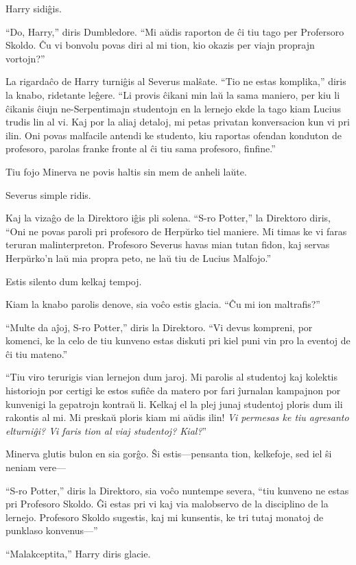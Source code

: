 Harry sidiĝis.

``Do, Harry,'' diris Dumbledore. ``Mi aŭdis raporton de ĉi tiu tago
per Profersoro Skoldo. Ĉu vi bonvolu povas diri al mi tion, kio okazis per
viajn proprajn vortojn?''

La rigardaĉo de Harry turniĝis al Severus malŝate. ``Tio ne estas
komplika,'' diris la knabo, ridetante leĝere. ``Li provis ĉikani min
laŭ la sama maniero, per kiu li ĉikanis ĉiujn ne-Serpentimajn
studentojn en la lernejo ekde la tago kiam Lucius trudis lin al
vi. Kaj por la aliaj detaloj, mi petas privatan konversacion kun vi
pri ilin. Oni povas malfacile antendi ke studento, kiu raportas
ofendan konduton de profesoro, parolas franke fronte al ĉi tiu sama
profesoro, finfine.''

Tiu fojo Minerva ne povis haltis sin mem de anheli laŭte.

Severus simple ridis.

Kaj la vizaĝo de la Direktoro iĝis pli solena. ``S-ro Potter,'' la
Direktoro diris, ``Oni ne povas paroli pri profesoro de Herpŭrko tiel
maniere. Mi timas ke vi faras teruran malinterpreton. Profesoro
Severus havas mian tutan fidon, kaj servas Herpŭrko'n laŭ mia propra
peto, ne laŭ tiu de Lucius Malfojo.''

Estis silento dum kelkaj tempoj.

Kiam la knabo parolis denove, sia voĉo estis glacia. ``Ĉu mi ion
maltrafis?''

``Multe da aĵoj, S-ro Potter,'' diris la Direktoro. ``Vi devus
kompreni, por komenci, ke la celo de tiu kunveno estas diskuti pri
kiel puni vin pro la eventoj de ĉi tiu mateno.''

``Tiu viro terurigis vian lernejon dum jaroj. Mi parolis al studentoj
kaj kolektis historiojn por certigi ke estos sufiĉe da matero por fari
ĵurnalan kampajnon por kunvenigi la gepatrojn kontraŭ li. Kelkaj el la
plej junaj studentoj ploris dum ili rakontis al mi. Mi preskaŭ ploris
kiam mi aŭdis ilin! \emph{Vi permesas ke tiu agresanto elturniĝi? Vi
faris tion al viaj studentoj? Kial?}''

Minerva glutis bulon en sia gorĝo. Ŝi estis—pensanta tion, kelkefoje,
sed iel ŝi neniam vere—   

``S-ro Potter,'' diris la Direktoro, sia voĉo nuntempe severa, ``tiu
kunveno ne estas pri Profesoro Skoldo. Ĝi estas pri vi kaj via
malobservo de la disciplino de la lernejo. Profesoro Skoldo sugestis,
kaj mi kunsentis, ke tri tutaj monatoj de punklaso konvenus—'' 


``Malakceptita,'' Harry diris glacie.

